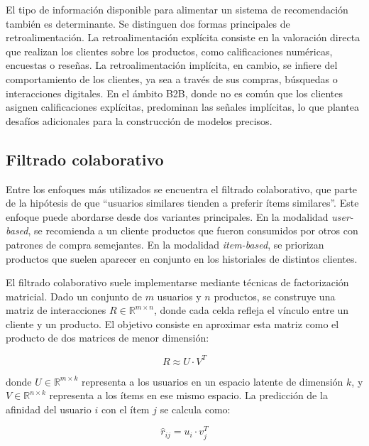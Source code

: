 El tipo de información disponible para alimentar un sistema de recomendación también es determinante. Se distinguen dos formas principales de retroalimentación. La retroalimentación explícita consiste en la valoración directa que realizan los clientes sobre los productos, como calificaciones numéricas, encuestas o reseñas. La retroalimentación implícita, en cambio, se infiere del comportamiento de los clientes, ya sea a través de sus compras, búsquedas o interacciones digitales. En el ámbito B2B, donde no es común que los clientes asignen calificaciones explícitas, predominan las señales implícitas, lo que plantea desafíos adicionales para la construcción de modelos precisos.

\subsection{Filtrado colaborativo}

Entre los enfoques más utilizados se encuentra el filtrado colaborativo, que parte de la hipótesis de que “usuarios similares tienden a preferir ítems similares”. Este enfoque puede abordarse desde dos variantes principales. En la modalidad \textit{user-based}, se recomienda a un cliente productos que fueron consumidos por otros con patrones de compra semejantes. En la modalidad \textit{item-based}, se priorizan productos que suelen aparecer en conjunto en los historiales de distintos clientes. 

El filtrado colaborativo suele implementarse mediante técnicas de factorización matricial. Dado un conjunto de $m$ usuarios y $n$ productos, se construye una matriz de interacciones $R \in \mathbb{R}^{m \times n}$, donde cada celda refleja el vínculo entre un cliente y un producto. El objetivo consiste en aproximar esta matriz como el producto de dos matrices de menor dimensión:

\begin{equation}
\label{eq:factorizacion}
R \approx U \cdot V^T
\end{equation}

donde $U \in \mathbb{R}^{m \times k}$ representa a los usuarios en un espacio latente de dimensión $k$, y $V \in \mathbb{R}^{n \times k}$ representa a los ítems en ese mismo espacio. La predicción de la afinidad del usuario $i$ con el ítem $j$ se calcula como:

\begin{equation}
\label{eq:prediccion_cf}
\hat{r}_{ij} = u_i \cdot v_j^T
\end{equation}

